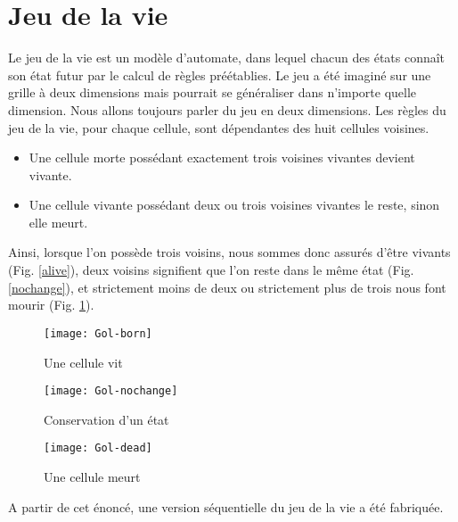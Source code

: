 \section{Jeu de la vie} %
\label{sec:jeu_de_la_vie}

Le jeu de la vie est un modèle d'automate, dans lequel chacun des états connaît son état futur par le calcul de règles préétablies. Le jeu a été imaginé sur une grille à deux dimensions mais pourrait se généraliser dans n'importe quelle dimension. Nous allons toujours parler du jeu en deux dimensions. Les règles du jeu de la vie, pour chaque cellule, sont dépendantes des huit cellules voisines.
\begin{itemize}
\item Une cellule morte possédant exactement trois voisines vivantes devient vivante.
\item Une cellule vivante possédant deux ou trois voisines vivantes le reste, sinon elle meurt.
\end{itemize}

Ainsi, lorsque l'on possède trois voisins, nous sommes donc assurés d'être vivants (Fig. \ref{alive}), deux voisins signifient que l'on reste dans le même état (Fig. \ref{nochange}), et strictement moins de deux ou strictement plus de trois nous font mourir (Fig. \ref{dead}).

\begin{figure}[h!]
\centering
\begin{minipage}{.3\textwidth}
\centering
\texttt{[image: Gol-born]}
\caption{Une cellule vit}
\label{alive}
\end{minipage}
\hspace{0.5cm}
\begin{minipage}{0.3\textwidth}
\centering
\texttt{[image: Gol-nochange]}
\caption{Conservation d'un état}
\label{nochange}
\end{minipage}
\hspace{0.5cm}
\begin{minipage}{.3\textwidth}
\centering
\texttt{[image: Gol-dead]}
\caption{Une cellule meurt}
\label{dead}
\end{minipage}
\end{figure}


A partir de cet énoncé, une version séquentielle du jeu de la vie a été fabriquée. 
